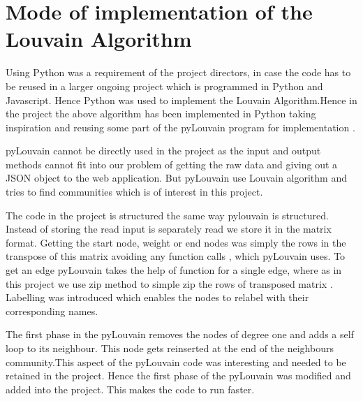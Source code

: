 \section{Mode of implementation of the Louvain Algorithm}
\par Using Python was a requirement of the project directors, in case the code has to be reused in a larger ongoing project which is programmed in Python and Javascript. Hence Python was used to implement the Louvain Algorithm.Hence in the project the above algorithm has been implemented in Python taking inspiration and reusing some part of the pyLouvain program for implementation \cite{pyLouvain}. 
\par pyLouvain cannot be directly used in the project as the input and output methods cannot fit into our problem of getting the raw data and giving out a JSON object to the web application. But pyLouvain use Louvain algorithm and tries to find communities which is of interest in this project. 
\par The code in the project is structured the same way pylouvain is structured. Instead of storing the read input is separately read we store it in the matrix format. Getting the start node, weight or end nodes was simply the rows in the transpose of this matrix avoiding any function calls , which pyLouvain uses. To get an edge pyLouvain takes the help of function for a single edge, where as in this project we use zip method to simple zip the rows of transposed matrix . Labelling was introduced which enables the nodes to relabel with their corresponding names.
\par The first phase in the pyLouvain removes the nodes of degree one and adds a self loop to its neighbour. This node gets reinserted at the end of the neighbours community.This aspect of the pyLouvain code was interesting and needed to be retained in the project.
Hence the first phase of the pyLouvain was modified and added into the project. 
This makes the code to run faster.
